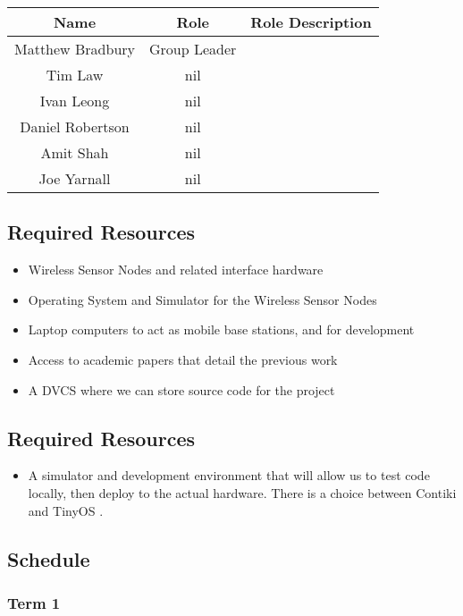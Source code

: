 \documentclass[a4paper]{article}
\begin{document}
\begin{table}[H]
\centering
	\begin{tabular}{| c | c | c |}
		\hline
		Name & Role & Role Description\\
		\hline
		Matthew Bradbury & Group Leader & ~ \\
		Tim Law & nil & ~ \\
		Ivan Leong & nil & ~ \\
		Daniel Robertson & nil & ~ \\
		Amit Shah & nil & ~ \\
		Joe Yarnall & nil & ~ \\
		\hline
	\end{tabular}
\end{table}

\subsection{Required Resources}
\begin{itemize}
	\item Wireless Sensor Nodes and related interface hardware
	\item Operating System and Simulator for the Wireless Sensor Nodes
	\item Laptop computers to act as mobile base stations, and for development
	\item Access to academic papers that detail the previous work
	\item A DVCS where we can store source code for the project
\end{itemize}

\subsection{Required Resources}
\begin{itemize}
	\item A simulator and development environment that will allow us to test code locally, then deploy to the actual hardware. There is a choice between Contiki \cite{23839452} and TinyOS \cite{levis2003tossim}.
\end{itemize}

\subsection{Schedule}

\subsubsection{Term 1}
\end{document}

